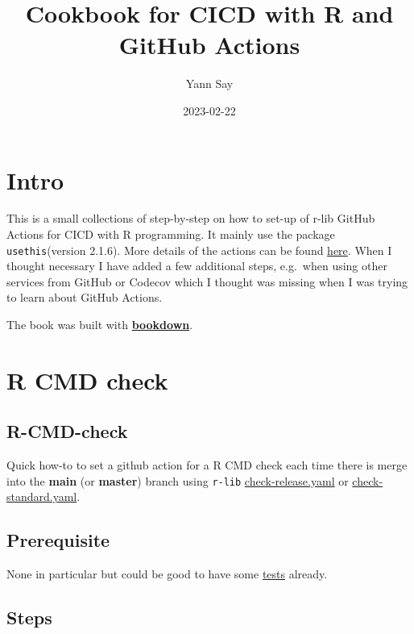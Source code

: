 \documentclass[
]{book}
\title{Cookbook for CICD with R and GitHub Actions}
\author{Yann Say}
\date{2023-02-22}
\begin{document}
\maketitle

{
\setcounter{tocdepth}{1}
\tableofcontents
}
\hypertarget{intro}{%
\chapter{Intro}\label{intro}}

This is a small collections of step-by-step on how to set-up of r-lib GitHub Actions for CICD with R programming. It mainly use the package \texttt{usethis}(version 2.1.6). More details of the actions can be found \href{https://github.com/r-lib/actions/tree/v2-branch/examples}{here}. When I thought necessary I have added a few additional steps, e.g.~when using other services from GitHub or Codecov which I thought was missing when I was trying to learn about GitHub Actions.

The book was built with \href{https://github.com/rstudio/bookdown}{\textbf{bookdown}}.

\hypertarget{r-cmd-check}{%
\chapter{R CMD check}\label{r-cmd-check}}

\hypertarget{r-cmd-check-1}{%
\section{R-CMD-check}\label{r-cmd-check-1}}

Quick how-to to set a github action for a R CMD check each time there is merge into the \textbf{main} (or \textbf{master}) branch using \texttt{r-lib} \href{https://github.com/r-lib/actions/blob/v2-branch/examples/check-release.yaml}{check-release.yaml} or \href{https://github.com/r-lib/actions/blob/v2-branch/examples/check-standard.yaml}{check-standard.yaml}.

\hypertarget{prerequisite}{%
\section{Prerequisite}\label{prerequisite}}

None in particular but could be good to have some \href{https://r-pkgs.org/testing-basics.html}{tests} already.

\hypertarget{steps}{%
\section{Steps}\label{steps}}
\end{document}
